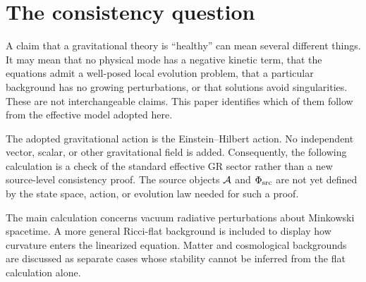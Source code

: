 \documentclass[11pt]{article}
\begin{document}

\section{The consistency question}
A claim that a gravitational theory is ``healthy'' can mean several different things. It may mean that no physical mode has a negative kinetic term, that the equations admit a well-posed local evolution problem, that a particular background has no growing perturbations, or that solutions avoid singularities. These are not interchangeable claims. This paper identifies which of them follow from the effective model adopted here.

The adopted gravitational action is the Einstein--Hilbert action. No independent vector, scalar, or other \Aflow{} gravitational field is added. Consequently, the following calculation is a check of the standard effective GR sector rather than a new source-level consistency proof. The source objects $\mathcal A$ and $\Phi_{\mathrm{src}}$ are not yet defined by the state space, action, or evolution law needed for such a proof.

The main calculation concerns vacuum radiative perturbations about Minkowski spacetime. A more general Ricci-flat background is included to display how curvature enters the linearized equation. Matter and cosmological backgrounds are discussed as separate cases whose stability cannot be inferred from the flat calculation alone.
\end{document}
